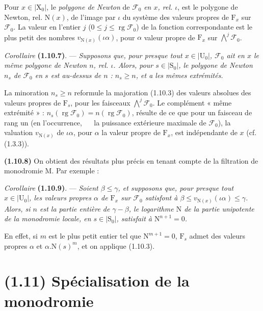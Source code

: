 \documentclass[11pt,leqno]{article}
\newcommand{\Page}[1]{\ifvmode\noindent\else\unskip\ \fi{\footnotesize\textcolor{gray}{[p.\,#1]}}\ \ignorespaces}
\begin{document}
Pour \(x\in\lvert\mathrm{X}_0\rvert\), le \textit{polygone de Newton} de \(\mathscr{F}_0\) \textit{en \(x\), rel. \(\iota\)}, est le polygone de Newton, rel. \(\mathrm{N}(x)\), de l’image par \(\iota\) du système des valeurs propres de \(\mathrm{F}_x\) sur \(\mathscr{F}_0\). La valeur en l’entier \(j\) (\(0\leq j\leq\operatorname{rg}\mathscr{F}_0\)) de la fonction correspondante est le plus petit des nombres \(v_{\mathrm{N}(x)}(\iota\alpha)\), pour \(\alpha\) valeur propre de \(\mathrm{F}_x\) sur \(\bigwedge\limits^{j}\mathscr{F}_0\).

\textit{Corollaire} \textbf{(1.10.7)}. — \textit{Supposons que, pour presque tout \(x\in\lvert\mathrm{U}_0\rvert\), \(\mathscr{F}_0\) ait en \(x\) le même polygone de Newton \(n\), rel. \(\iota\). Alors, pour \(s\in\lvert\mathrm{S}_0\rvert\), le polygone de Newton \(n_s\) de \(\mathscr{F}_0\) en \(s\) est au-dessus de \(n\) : \(n_s\geq n\), et a les mêmes extrémités.}

La minoration \(n_s\geq n\) reformule la majoration (1.10.3) des valeurs absolues des valeurs propres de \(\mathrm{F}_s\), pour les faisceaux \(\bigwedge\limits^{j}\mathscr{F}_0\). Le complément « même extrémité » : \(n_s(\operatorname{rg}\mathscr{F}_0)=n(\operatorname{rg}\mathscr{F}_0)\), résulte de ce que pour un faisceau de rang un (en l’occurrence,
\Page{184}
la puissance extérieure maximale de \(\mathscr{F}_0\)), la valuation \(v_{\mathrm{N}(x)}\) de \(\iota\alpha\), pour \(\alpha\) la valeur propre de \(\mathrm{F}_x\), est indépendante de \(x\) (cf. (1.3.3)).

\textbf{(1.10.8)} On obtient des résultats plus précis en tenant compte de la filtration de monodromie \(\mathrm{M}\). Par exemple :

\textit{Corollaire} \textbf{(1.10.9)}. — \textit{Soient \(\beta\leq\gamma\), et supposons que, pour presque tout \(x\in\lvert\mathrm{U}_0\rvert\), les valeurs propres \(\alpha\) de \(\mathrm{F}_x\) sur \(\mathscr{F}_0\) satisfont à \(\beta\leq v_{\mathrm{N}(x)}(\iota\alpha)\leq\gamma\). Alors, si \(n\) est la partie entière de \(\gamma-\beta\), le logarithme \(\mathrm{N}\) de la partie unipotente de la monodromie locale, en \(s\in\lvert\mathrm{S}_0\rvert\), satisfait à \(\mathrm{N}^{n+1}=0\).}

En effet, si \(m\) est le plus petit entier tel que \(\mathrm{N}^{m+1}=0\), \(\mathrm{F}_s\) admet des valeurs propres \(\alpha\) et \(\alpha.\mathrm{N}(s)^m\), et on applique (1.10.3).

\section*{(1.11) Spécialisation de la monodromie}
\end{document}
